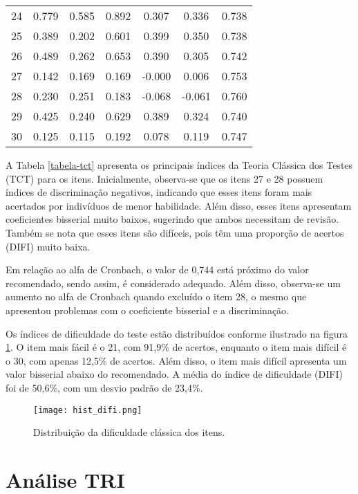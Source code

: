 \begin{table}[H]
{\begin{tabular*}{.6\textwidth}{@{\extracolsep{\fill}}ccccccc@{}}
			24 & 0.779 & 0.585 & 0.892 & 0.307 & 0.336 & 0.738 \\ 
			25 & 0.389 & 0.202 & 0.601 & 0.399 & 0.350 & 0.738 \\ 
			26 & 0.489 & 0.262 & 0.653 & 0.390 & 0.305 & 0.742 \\ 
			27 & 0.142 & 0.169 & 0.169 & -0.000 & 0.006 & 0.753 \\ 
			28 & 0.230 & 0.251 & 0.183 & -0.068 & -0.061 & 0.760 \\ 
			29 & 0.425 & 0.240 & 0.629 & 0.389 & 0.324 & 0.740 \\ 
			30 & 0.125 & 0.115 & 0.192 & 0.078 & 0.119 & 0.747 \\  
			\bottomrule
		\end{tabular*}
	}{%
	}
\end{table}

A Tabela \ref{tabela-tct} apresenta os principais índices da Teoria Clássica dos Testes (TCT) para os itens. Inicialmente, observa-se que os itens 27 e 28 possuem índices de discriminação negativos, indicando que esses itens foram mais acertados por indivíduos de menor habilidade. Além disso, esses itens apresentam coeficientes bisserial muito baixos, sugerindo que ambos necessitam de revisão. Também se nota que esses itens são difíceis, pois têm uma proporção de acertos (DIFI) muito baixa.

Em relação ao alfa de Cronbach, o valor de 0,744 está próximo do valor recomendado, sendo assim, é considerado adequado. Além disso, observa-se um aumento no alfa de Cronbach quando excluído o item 28, o mesmo que apresentou problemas com o coeficiente bisserial e a discriminação.



Os índices de dificuldade do teste estão distribuídos conforme ilustrado na figura \ref{fig:hist_difi}. O item mais fácil é o 21, com 91,9\% de acertos, enquanto o item mais difícil é o 30, com apenas 12,5\% de acertos. Além disso, o item mais difícil apresenta um valor bisserial abaixo do recomendado. A média do índice de dificuldade (DIFI) foi de 50,6\%, com um desvio padrão de 23,4\%.

\begin{figure}[H]
	\centering
	\texttt{[image: hist\_difi.png]}
	\caption{Distribuição da dificuldade clássica dos itens.}
	\label{fig:hist_difi}
\end{figure}


\section{Análise TRI}





